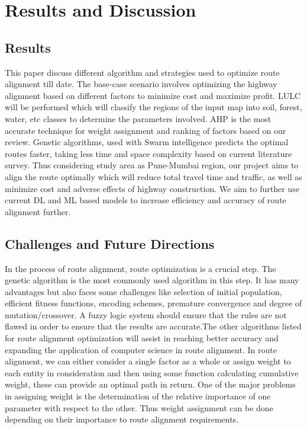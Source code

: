 %

\chapter{Results and Discussion}
\section{Results}
This paper discuss different algorithm and strategies used to optimize route alignment till date. The base-case scenario involves optimizing the highway alignment
based on different factors to minimize cost and maximize profit.
LULC will be performed which will classify the regions of the input map into soil, forest, water, etc classes to determine the parameters involved. AHP is the most accurate technique for weight assignment and ranking of factors based on our review. Genetic algorithms, used with Swarm intelligence predicts the optimal routes faster, taking less time and space complexity based on current literature survey. Thus considering study area as Pune-Mumbai region, our project aims to align the route optimally which will reduce total travel time and traffic, as well as minimize cost and adverse effects of highway construction. We aim to further use current DL and ML based models to increase efficiency and accuracy of route alignment further.
\section{Challenges and Future Directions}
In the process of route alignment, route optimization is a crucial step. The genetic algorithm is the most commonly used algorithm in this step. It has many advantages but also faces some challenges like selection of initial population, efficient fitness functions, encoding schemes, premature convergence and degree of mutation/crossover. A fuzzy logic system should ensure that the rules are not flawed in order to ensure that the results are accurate.The other algorithms listed for route alignment optimization will assist in reaching better accuracy and expanding the application of computer science in route alignment. 
\newline
In route alignment, we can either consider a single factor as a whole or assign weight to each entity in consideration and then using some function calculating cumulative weight, these can provide an optimal path in return. One of the major problems in assigning weight is the determination of the relative importance of one parameter with respect to the other. Thus weight assignment can be done depending on their importance to route alignment requirements.


